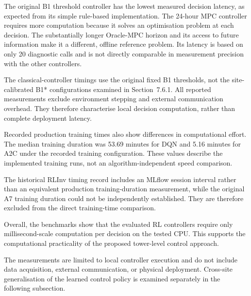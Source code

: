 \begin{revisedblock}
The original B1 threshold controller has the
lowest measured decision latency, as expected
from its simple rule-based implementation.
The 24-hour MPC controller requires more
computation because it solves an optimisation
problem at each decision. The substantially
longer Oracle-MPC horizon and its access to
future information make it a different,
offline reference problem. Its latency is
based on only 20 diagnostic calls and is
not directly comparable in measurement
precision with the other controllers.

The classical-controller timings use the
original fixed B1 thresholds, not the
site-calibrated B1* configurations examined
in Section~7.6.1. All reported measurements
exclude environment stepping and external
communication overhead. They therefore
characterise local decision computation,
rather than complete deployment latency.
\end{revisedblock}

\begin{revisedblock}
Recorded production training times also show
differences in computational effort. The median
training duration was 53.69 minutes for DQN
and 5.16 minutes for A2C under the recorded
training configuration. These values describe
the implemented training runs, not an
algorithm-independent speed comparison.

The historical RLInv timing record includes
an MLflow session interval rather than an
equivalent production training-duration
measurement, while the original A7 training
duration could not be independently established.
They are therefore excluded from the direct
training-time comparison.

Overall, the benchmarks show that the evaluated
RL controllers require only millisecond-scale
computation per decision on the tested CPU.
This supports the computational practicality
of the proposed tower-level control approach.

The measurements are limited to local controller
execution and do not include data acquisition,
external communication, or physical deployment.
Cross-site generalisation of the learned
control policy is examined separately in the
following subsection.

\end{revisedblock}



